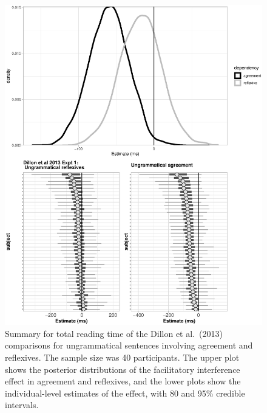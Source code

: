 \documentclass{cambridge7A}\usepackage[]{graphicx}\usepackage[]{color}
\makeatletter
\def\maxwidth{ %
  \ifdim\Gin@nat@width>\linewidth
    \linewidth
  \else
    \Gin@nat@width
  \fi
}
\newenvironment{knitrout}{}{} %
\makeatother
\begin{document}
\begin{figure}[!hbtp]
\centering
\begin{knitrout}
\color{fgcolor}

{\centering \includegraphics[width=\maxwidth]{figures/fig-unnamed-chunk-1-1} 

}



\end{knitrout}
\caption{Summary for total reading time of the Dillon et al.\ (2013) comparisons for ungrammatical sentences involving agreement and reflexives. The sample size was 40 participants. The upper plot shows the posterior distributions of the facilitatory interference effect in agreement and reflexives, and the lower plots show the individual-level estimates of the effect, with 80 and 95\% credible intervals.}\label{fig:dillonresults}
\end{figure}
\end{document}
